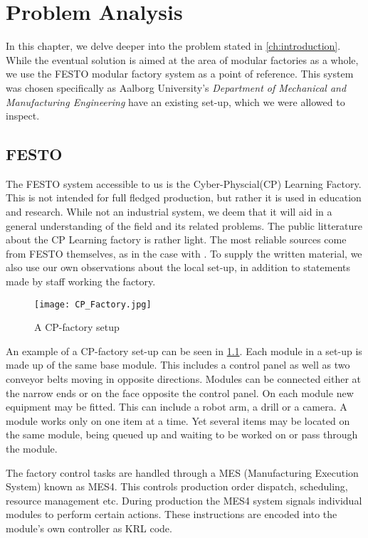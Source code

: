 \chapter{Problem Analysis}\label{ch:problemanalysis}
In this chapter, we delve deeper into the problem stated in \cref{ch:introduction}. While the eventual solution is aimed at the area of modular factories as a whole, we use the FESTO modular factory system \cite{FESTOweb} as a point of reference. This system was chosen specifically as Aalborg University's \textit{Department of Mechanical and Manufacturing Engineering} have an existing set-up, which we were allowed to inspect. 

\section{FESTO}\label{sec:festo}
The FESTO system accessible to us is the Cyber-Physcial(CP) Learning Factory. This is not intended for full fledged production, but rather it is used in education and research. While not an industrial system, we deem that it will aid in a general understanding of the field and its related problems. The public litterature about the CP Learning factory is rather light. The most reliable sources come from FESTO themselves, as in the case with \cite{CPFactory2015}. To supply the written material, we also use our own observations about the local set-up, in addition to statements made by staff working the factory.  

\begin{figure}[h]
\centering
\texttt{[image: CP\_Factory.jpg]}
\caption{A CP-factory setup}
\label{fig:festo-example}
\end{figure}

An example of a CP-factory set-up can be seen in \cref{fig:festo-example}. Each module in a set-up is made up of the same base module. This includes a control panel as well as two conveyor belts moving in opposite directions. Modules can be connected either at the narrow ends or on the face opposite the control panel. On each module new equipment may be fitted. This can include a robot arm, a drill or a camera. A module works only on one item at a time. Yet several items may be located on the same module, being queued up and waiting to be worked on or pass through the module.

The factory control tasks are handled through a MES (Manufacturing Execution System) known as MES4. This controls production order dispatch, scheduling, resource management etc. During production the MES4 system signals individual modules to perform certain actions. These instructions are encoded into the module's own controller as KRL code.

